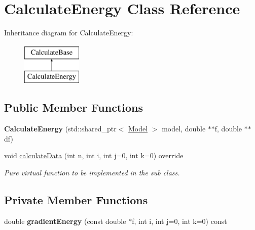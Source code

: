 \hypertarget{class_calculate_energy}{}\section{Calculate\+Energy Class Reference}
\label{class_calculate_energy}
Inheritance diagram for Calculate\+Energy\+:\begin{figure}[H]
\begin{center}
\leavevmode
\includegraphics[height=2.000000cm]{class_calculate_energy}
\end{center}
\end{figure}
\subsection*{Public Member Functions}
\begin{DoxyCompactItemize}
\item 
\mbox{\label{class_calculate_energy_aa307650f8e9652782e1024f6450a7028}} 
{\bfseries Calculate\+Energy} (std\+::shared\+\_\+ptr$<$ \mbox{\hyperlink{class_model}{Model}} $>$ model, double $\ast$$\ast$f, double $\ast$$\ast$df)
\item 
\mbox{\label{class_calculate_energy_a7501b04772918eb12d0b6fd7659df4ce}} 
void \mbox{\hyperlink{class_calculate_energy_a7501b04772918eb12d0b6fd7659df4ce}{calculate\+Data}} (int n, int i, int j=0, int k=0) override
\begin{DoxyCompactList}\small\item\em Pure virtual function to be implemented in the sub class. \end{DoxyCompactList}\end{DoxyCompactItemize}
\subsection*{Private Member Functions}
\begin{DoxyCompactItemize}
\item 
\mbox{\label{class_calculate_energy_a65c66f5908b9402f317924594c20435e}} 
double {\bfseries gradient\+Energy} (const double $\ast$f, int i, int j=0, int k=0) const
\end{DoxyCompactItemize}

